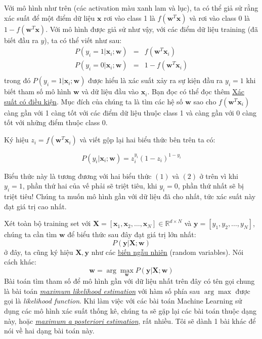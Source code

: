 Với mô hình như trên (các activation màu xanh lam và lục), ta có thể giả sử rằng xác suất để một điểm dữ liệu $\mathbf{x}$ rơi vào class 1 là $f(\mathbf{w}^T\mathbf{x})$ và rơi vào class 0 là $1 - f(\mathbf{w}^T\mathbf{x})$. Với mô hình được giả sử như vậy, với các điểm dữ liệu training (đã biết đầu ra $y$), ta có thể viết như sau: 
 \begin{eqnarray*}
P(y_i = 1 | \mathbf{x}_i; \mathbf{w}) &=& f(\mathbf{w}^T\mathbf{x}_i) \\
P(y_i = 0 | \mathbf{x}_i; \mathbf{w}) &=& 1 - f(\mathbf{w}^T\mathbf{x}_i) \\ 
\end{eqnarray*}
trong đó $ P(y_i = 1 | \mathbf{x}_i; \mathbf{w})$ được hiểu là xác suất xảy ra sự kiện đầu ra $y_i = 1$ khi biết tham số mô hình $\mathbf{w}$ và dữ liệu đầu vào $\mathbf{x}_i$. Bạn đọc có thể đọc thêm \href{https://vi.wikipedia.org/wiki/Xác_suất_có_điều_kiện}{Xác suất có điều kiện}. Mục đích của chúng ta là tìm các hệ số $\mathbf{w}$ sao cho $f(\mathbf{w}^T\mathbf{x}_i)$ càng gần với 1 càng tốt với các điểm dữ liệu thuộc class 1 và càng gần với 0 càng tốt với những điểm thuộc class 0. 
 
Ký hiệu $z_i = f(\mathbf{w}^T\mathbf{x}_i)$ và viết gộp lại hai biểu thức bên trên ta có: 

\begin{equation*} 
P(y_i| \mathbf{x}_i; \mathbf{w}) = z_i^{y_i}(1 - z_i)^{1- y_i} 
\end{equation*} 
 
Biểu thức này là tương đương với hai biểu thức $(1)$ và $(2)$ ở trên vì khi $y_i=1$, phần thứ hai của vế phải sẽ triệt tiêu, khi $y_i = 0$, phần thứ nhất sẽ bị triệt tiêu! Chúng ta muốn mô hình gần với dữ liệu đã cho nhất, tức xác suất này đạt giá trị cao nhất.  
 
Xét toàn bộ training set với $\mathbf{X} = [\mathbf{x}_1,\mathbf{x}_2, \dots, \mathbf{x}_N] \in \mathbb{R}^{d \times N}$ và $\mathbf{y} = [y_1, y_2, \dots, y_N]$, chúng ta cần tìm $\mathbf{w}$ để biểu thức sau đây đạt giá trị lớn nhất: 
\begin{equation*} 
P(\mathbf{y}|\mathbf{X}; \mathbf{w}) 
\end{equation*} 
ở đây, ta cũng ký hiệu $\mathbf{X, y}$ như các \href{https://vi.wikipedia.org/wiki/Biến_ngẫu_nhiên}{biến ngẫu nhiên} (random variables). Nói cách khác: 
\begin{equation*} 
\mathbf{w} = \arg\max_{\mathbf{w}} P(\mathbf{y}|\mathbf{X}; \mathbf{w}) 
\end{equation*} 
Bài toán tìm tham số để mô hình gần với dữ liệu nhất trên đây có tên gọi chung là bài toán \href{https://en.wikipedia.org/wiki/Maximum_likelihood_estimation}{\textit{maximum likelihood estimation}} với hàm số phía sau $\arg\max$ được gọi là \textit{likelihood function}. Khi làm việc với các bài toán Machine Learning sử dụng các mô hình xác suất thống kê, chúng ta sẽ gặp lại các bài toán thuộc dạng này, hoặc \href{https://en.wikipedia.org/wiki/Maximum_a_posteriori_estimation}{\textit{maximum a posteriori estimation}}, rất nhiều. Tôi sẽ dành 1 bài khác để nói về hai dạng bài toán này. 
 
